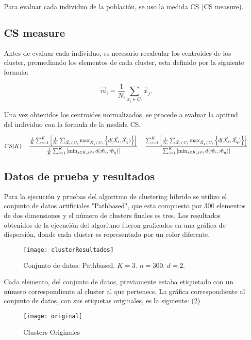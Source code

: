 \documentclass[
]{article}
\begin{document}
Para evaluar cada individuo de la población, se uso la medida CS (CS measure).
\subsection{CS measure}
Antes de evaluar cada individuo, es necesario recalcular los centroides de los cluster, promediando los elementos de cada cluster, esta definido por la siguiente formula:

\begin{equation}\label{eq:cent}
\vec{m}_i = \frac{1}{N_i} \sum_{x_j\in{C_i}} \vec{x}_j.
\end{equation}

Una vez obtenidos los centroides normalizados, se procede a evaluar la aptitud del individuo con la formula de la medida CS.

\begin{equation}\label{eq:cent}
CS(K) = \frac {\frac{1}{K} \sum_{i=1}^K \left [ \frac{1}{N_i} \sum_{\vec{X}_i\in{C_i}} \max_{\vec{X}_q\in{C_i}} \left \lbrace d(\vec{X}_i,\vec{X}_q) \right \rbrace \right ] } {\frac{1}{K} \sum_{i=1}^K \left [ \min_{j \in K, j \not= i} {d(\vec{m}_i, \vec{m}_q)} \right]} \\
= \frac {\sum_{i=1}^K \left [ \frac{1}{N_i} \sum_{\vec{X}_i\in{C_i}} \max_{\vec{X}_q\in{C_i}} \left \lbrace d(\vec{X}_i,\vec{X}_q) \right \rbrace \right ] } {\sum_{i=1}^K \left [ \min_{j \in K, j \not= i} {d(\vec{m}_i, \vec{m}_q)} \right]}
\end{equation}
\subsection{Datos de prueba y resultados}
Para la ejecución y pruebas del algoritmo de clustering híbrido se utilizo el conjunto de datos artificiales "Pathbased", que esta compuesto por 300 elementos de dos dimensiones y el número de clusters finales es tres.
Los resultados obtenidos de la ejecución del algoritmo fueron graficados en una gráfica de dispersión, donde cada cluster es representado por un color diferente.

\begin{figure}[h]
  \centering
    \texttt{[image: clusterResultados]}
  \caption{Conjunto de datos: Pathbased. $K=3$. $n=300$. $d=2$.}
  \label{fig:clusterHibrido}
\end{figure}

Cada elemento, del conjunto de datos, previamente estaba etiquetado con un número correspondiente al cluster al que pertenece. La gráfica correspondiente al conjunto de datos, con sus etiquetas originales, es la siguiente: (\ref{fig:original})
\begin{figure}[h]
  \centering
    \texttt{[image: original]}
  \caption{Clusters Originales}
  \label{fig:original}
\end{figure}
\end{document}
